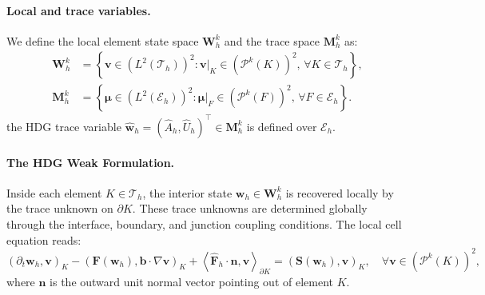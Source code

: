 \documentclass[11pt]{article}
\newcommand{\Th}{\mathcal{T}_h}
\newcommand{\Eh}{\mathcal{E}_h}
\begin{document}
\paragraph{Local and trace variables.}
We define the local element state space $\mathbf{W}_h^k$ and the trace space $\mathbf{M}_h^k$ as:
\begin{align*}
  \mathbf{W}_h^k &= \left\{ \mathbf{v} \in (L^2(\Th))^2 : \mathbf{v}|_K \in (\mathcal{P}^k(K))^2, \, \forall K \in \Th \right\}, \\
  \mathbf{M}_h^k &= \left\{ \bm{\mu} \in (L^2(\Eh))^2 : \bm{\mu}|_F \in (\mathcal{P}^k(F))^2, \, \forall F \in \Eh \right\}.
\end{align*}
the HDG trace variable $\widehat{\mathbf{w}}_h = (\widehat{A}_h, \widehat{U}_h)^\top \in \mathbf{M}_h^k$ is defined over $\Eh$.

\paragraph{The HDG Weak Formulation.}
Inside each element $K \in \Th$, the interior state $\mathbf{w}_h \in \mathbf{W}_h^k$ is recovered locally by the trace unknown on $\partial K$. These trace unknowns are determined globally through the interface, boundary, and junction coupling conditions. The local cell equation reads: 
\begin{equation}
  \left(\partial_t \mathbf{w}_h, \mathbf{v}\right)_K - \left(\mathbf{F}(\mathbf{w}_h), \bm b \cdot \nabla \mathbf{v}\right)_K + \left\langle \widehat{\mathbf{F}}_h \cdot \bm n, \mathbf{v} \right\rangle_{\partial K} = \left(\mathbf{S}(\mathbf{w}_h), \mathbf{v}\right)_K, \quad \forall \mathbf{v} \in (\mathcal{P}^k(K))^2,
  \label{eq:hdg_local}
\end{equation}
where $\bm n$ is the outward unit normal vector pointing out of element $K$. 
\end{document}
